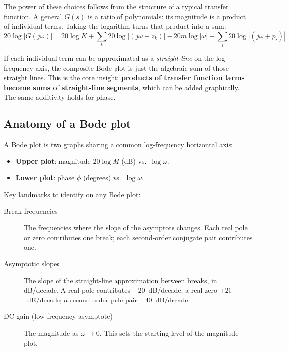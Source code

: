 \documentclass[12pt]{article}
\begin{document}
The power of these choices follows from the structure of a typical transfer
function.  A general $G(s)$ is a ratio of polynomials: its magnitude is a
product of individual terms.  Taking the logarithm turns that product into a
sum:
\begin{equation}
  20\log|G(j\omega)| = 20\log K
    + \sum_k 20\log|(j\omega + z_k)|
    - 20m\log|\omega|
    - \sum_i 20\log|(j\omega + p_i)|
  \label{eq:log_sum}
\end{equation}

If each individual term can be approximated as a \emph{straight line} on the
log-frequency axis, the composite Bode plot is just the algebraic sum of those
straight lines.  This is the core insight: \textbf{products of transfer
function terms become sums of straight-line segments}, which can be added
graphically.  The same additivity holds for phase.

\subsection{Anatomy of a Bode plot}
\label{sec:anatomy}

A Bode plot is two graphs sharing a common log-frequency horizontal axis:
\begin{itemize}
  \item \textbf{Upper plot}: magnitude $20\log M$ (dB) vs.\ $\log\omega$.
  \item \textbf{Lower plot}: phase $\phi$ (degrees) vs.\ $\log\omega$.
\end{itemize}

Key landmarks to identify on any Bode plot:
\begin{description}
  \item[Break frequencies] The frequencies where the slope of the asymptote
    changes.  Each real pole or zero contributes one break; each second-order
    conjugate pair contributes one.
  \item[Asymptotic slopes] The slope of the straight-line approximation between
    breaks, in dB/decade.  A real pole contributes $-20$~dB/decade; a real
    zero $+20$~dB/decade; a second-order pole pair $-40$~dB/decade.
  \item[DC gain (low-frequency asymptote)] The magnitude as $\omega \to 0$.
    This sets the starting level of the magnitude plot.
\end{description}
\end{document}
